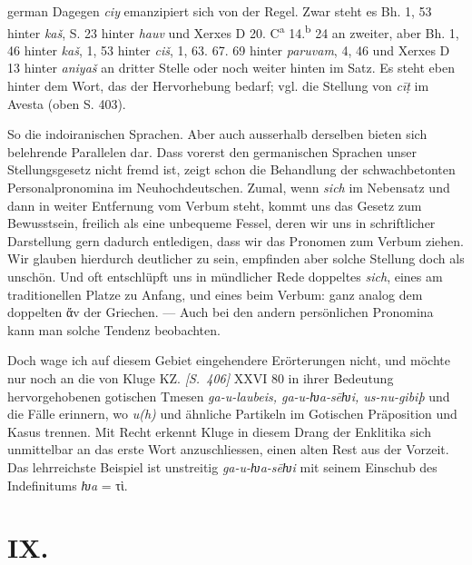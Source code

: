 \begin{otherlanguage*}{german}
Dagegen \emph{ciy} emanzipiert sich von der Regel. Zwar steht es Bh. 1, 53 hinter \emph{kaš}, S. 23 hinter \emph{hauv} und Xerxes D 20. C\textsuperscript{a} 14.\textsuperscript{b} 24 an zweiter, aber Bh. 1, 46 hinter \emph{kaš}, 1, 53 hinter \emph{ciš}, 1, 63. 67. 69 hinter \emph{paruvam}, 4, 46 und Xerxes D 13 hinter \emph{aniyaš} an dritter Stelle oder noch weiter hinten im Satz. Es steht eben hinter dem Wort, das der Hervorhebung bedarf; vgl. die Stellung von \emph{cīṭ} im Avesta (oben S. 403).

So die indoiranischen Sprachen. Aber auch ausserhalb derselben bieten sich belehrende Parallelen dar. Dass vorerst den germanischen Sprachen unser Stellungsgesetz nicht fremd ist, zeigt schon die Behandlung der schwachbetonten Personalpronomina im Neuhochdeutschen. Zumal, wenn \emph{sich} im Nebensatz und dann in weiter Entfernung vom Verbum steht, kommt uns das Gesetz zum Bewusstsein, freilich als eine unbequeme Fessel, deren wir uns in schriftlicher Darstellung gern dadurch entledigen, dass wir das Pronomen zum Verbum ziehen. Wir glauben hierdurch deutlicher zu sein, empfinden aber solche Stellung doch als unschön. Und oft entschlüpft uns in mündlicher Rede doppeltes \emph{sich}, eines am traditionellen Platze zu Anfang, und eines beim Verbum: ganz analog dem doppelten ἄv der Griechen. — Auch bei den andern persönlichen Pronomina kann man solche Tendenz beobachten.

Doch wage ich auf diesem Gebiet eingehendere Erörterungen nicht, und möch\-te nur noch an die von Kluge KZ. \hypertarget{p406}{\emph{[S.~406]}}\label{p406} XXVI 80 in ihrer Bedeutung hervorgehobenen gotischen Tmesen \emph{ga-u-laubeis, ga-u-ƕa-sēƕi, us-nu-gibiþ} und die Fälle erinnern, wo \emph{u(h)} und ähnliche Partikeln im Gotischen Präposition und Kasus trennen. Mit Recht erkennt Kluge in diesem Drang der Enklitika sich unmittelbar an das erste Wort anzuschliessen, einen alten Rest aus der Vorzeit. Das lehrreichste Beispiel ist unstreitig \emph{ga-u-ƕa-sēƕi} mit seinem Einschub des Indefinitums \emph{ƕa} = τὶ.

\section*{IX.}


\end{otherlanguage*}
